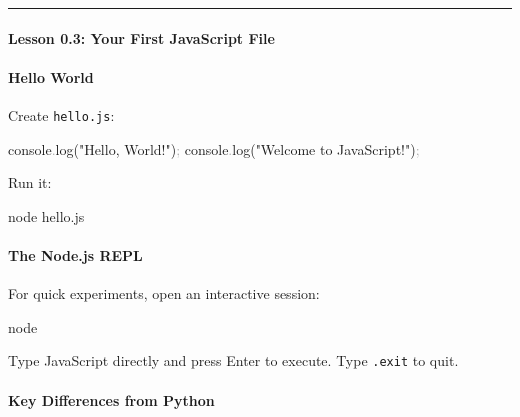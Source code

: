 \documentclass[
  justified,
  openright,
]{tufte-book}
\let\subsection\paragraph
\let\paragraph\paragraph
\newcommand{\StringTok}[1]{\textcolor{CodeString}{#1}}              %
\newcommand{\CodeFuncTok}[1]{\textcolor{CodeKeyword}{#1}}           %
\newcommand{\OperatorTok}[1]{\textcolor{DarkGray}{#1}}              %
\newenvironment{Shaded}{%
  \begin{mdframed}[style=TufteCode]%
}{%
  \end{mdframed}%
}
\let\subsection\paragraph
\let\paragraph\paragraph
\begin{document}
\begin{center}\rule{0.5\linewidth}{0.5pt}\end{center}

\subsection{Lesson 0.3: Your First JavaScript
File}\label{lesson-0.3-your-first-javascript-file}

\subsection{Hello World}\label{hello-world}

Create \texttt{hello.js}:

\begin{Shaded}
\begin{Highlighting}[]
console\OperatorTok{.}\CodeFuncTok{log}(\StringTok{"Hello, World!"})\OperatorTok{;}
console\OperatorTok{.}\CodeFuncTok{log}(\StringTok{"Welcome to JavaScript!"})\OperatorTok{;}
\end{Highlighting}
\end{Shaded}

Run it:

\begin{Shaded}
\begin{Highlighting}[]
node hello.js
\end{Highlighting}
\end{Shaded}

\subsection{The Node.js REPL}\label{the-node.js-repl}

For quick experiments, open an interactive session:

\begin{Shaded}
\begin{Highlighting}[]
node
\end{Highlighting}
\end{Shaded}

Type JavaScript directly and press Enter to execute. Type \texttt{.exit}
to quit.

\subsection{Key Differences from
Python}\label{key-differences-from-python}
\end{document}
